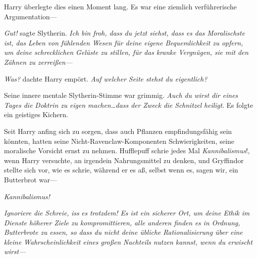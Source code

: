 Harry überlegte dies einen Moment lang. Es war eine ziemlich verführerische Argumentation—

\emph{Gut!} sagte Slytherin. \emph{Ich bin froh, dass du jetzt siehst, dass es das Moralischste ist, das Leben von fühlenden Wesen für deine eigene Bequemlichkeit zu opfern, um deine schrecklichen Gelüste zu stillen, für das kranke Vergnügen, sie mit den Zähnen zu zerreißen—}

\emph{Was?} dachte Harry empört. \emph{Auf welcher Seite stehst du eigentlich?}

Seine innere mentale Slytherin-Stimme war grimmig. \emph{Auch du wirst dir eines Tages die Doktrin zu eigen machen…dass der Zweck die Schnitzel heiligt}. Es folgte ein geistiges Kichern.

Seit Harry anfing sich zu sorgen, dass auch Pflanzen empfindungsfähig sein könnten, hatten seine Nicht-Ravenclaw-Komponenten Schwierigkeiten, seine moralische Vorsicht ernst zu nehmen. Hufflepuff schrie jedes Mal \emph{Kannibalismus}!, wenn Harry versuchte, an irgendein Nahrungsmittel zu denken, und Gryffindor stellte sich vor, wie es schrie, während er es aß, selbst wenn es, sagen wir, ein Butterbrot war—

\emph{Kannibalismus!}

\emph{}

\emph{Ignoriere die Schreie,} \emph{iss} \emph{es trotzdem! Es ist ein sicherer Ort, um deine Ethik im Dienste höherer Ziele zu kompromittieren, alle anderen finden es in Ordnung, Butterbrote zu essen, so dass du nicht deine übliche Rationalisierung über eine kleine Wahrscheinlichkeit eines großen Nachteils nutzen kannst, wenn du erwischt wirst—}


